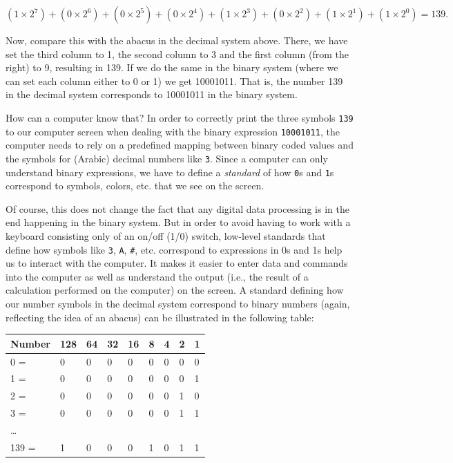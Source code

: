 \documentclass[
  12pt,
]{style/krantz}
\begin{document}
\[(1 \times 2^7) + (0 \times 2^6) +  (0 \times 2^5) +  (0 \times 2^4) + (1 \times 2^3) + (0 \times 2^2) + (1 \times 2^1) +  (1 \times 2^0)  = 139.\]

Now, compare this with the abacus in the decimal system above. There, we have set the third column to 1, the second column to 3 and the first column (from the right) to 9, resulting in 139. If we do the same in the binary system (where we can set each column either to 0 or 1) we get 10001011. That is, the number 139 in the decimal system corresponds to 10001011 in the binary system.

How can a computer know that? In order to correctly print the three symbols \texttt{139} to our computer screen when dealing with the binary expression \texttt{10001011}, the computer needs to rely on a predefined mapping between binary coded values and the symbols for (Arabic) decimal numbers like \texttt{3}. Since a computer can only understand binary expressions, we have to define a \emph{standard} of how \texttt{0}s and \texttt{1}s correspond to symbols, colors, etc. that we see on the screen.

Of course, this does not change the fact that any digital data processing is in the end happening in the binary system. But in order to avoid having to work with a keyboard consisting only of an on/off (1/0) switch, low-level standards that define how symbols like \texttt{3}, \texttt{A}, \texttt{\#}, etc. correspond to expressions in 0s and 1s help us to interact with the computer. It makes it easier to enter data and commands into the computer as well as understand the output (i.e., the result of a calculation performed on the computer) on the screen. A standard defining how our number symbols in the decimal system correspond to binary numbers (again, reflecting the idea of an abacus) can be illustrated in the following table:

\begin{longtable}[]{@{}lllllllll@{}}
\toprule
Number & 128 & 64 & 32 & 16 & 8 & 4 & 2 & 1 \\
\midrule
\endhead
0 = & 0 & 0 & 0 & 0 & 0 & 0 & 0 & 0 \\
1 = & 0 & 0 & 0 & 0 & 0 & 0 & 0 & 1 \\
2 = & 0 & 0 & 0 & 0 & 0 & 0 & 1 & 0 \\
3 = & 0 & 0 & 0 & 0 & 0 & 0 & 1 & 1 \\
\ldots{} & & & & & & & & \\
139 = & 1 & 0 & 0 & 0 & 1 & 0 & 1 & 1 \\
\bottomrule
\end{longtable}
\end{document}
